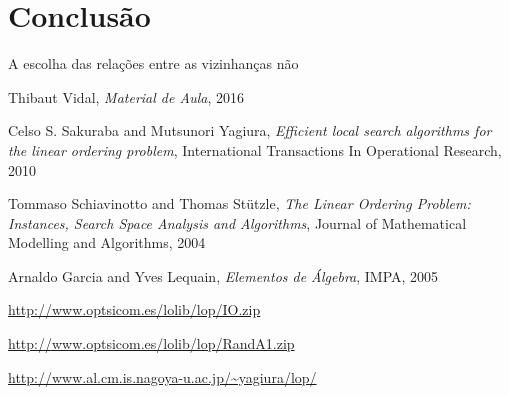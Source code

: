 \documentclass[a4paper,10pt,onecolumn]{article}
\begin{document}

\section{Conclusão}

A escolha das relações entre as vizinhanças não 

\begin{thebibliography}{99}
 Thibaut Vidal, \emph{Material de Aula}, 2016

 Celso S. Sakuraba and Mutsunori Yagiura,
\emph{Efficient local search algorithms for the linear ordering problem},
International Transactions In Operational Research, 2010

 Tommaso Schiavinotto and Thomas Stützle, \emph{The Linear
Ordering Problem: Instances, Search Space Analysis and Algorithms}, Journal of
Mathematical Modelling and Algorithms, 2004

 Arnaldo Garcia and Yves Lequain, \emph{Elementos de
Álgebra}, IMPA, 2005

\url{http://www.optsicom.es/lolib/lop/IO.zip}

\url{http://www.optsicom.es/lolib/lop/RandA1.zip}

\url{http://www.al.cm.is.nagoya-u.ac.jp/~yagiura/lop/}



\end{thebibliography}
\end{document}

